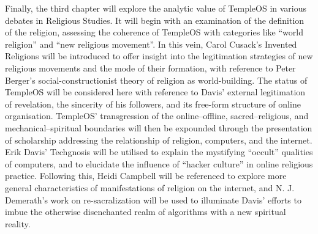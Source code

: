 \documentclass[Draft.tex]{subfiles}
\begin{document}
Finally, the third chapter will explore the analytic value of TempleOS
in various debates in Religious Studies.
It will begin with an examination of the definition of the religion,
assessing the coherence of TempleOS with categories like ``world religion''
and ``new religious movement''.
In this vein, Carol Cusack's Invented Religions will be introduced
to offer insight into the legitimation strategies of new religious movements
and the mode of their formation,
with reference to Peter Berger's social-constructionist
theory of religion as world-building.
The status of TempleOS will be considered here with reference to
Davis' external legitimation of revelation, the sincerity of his followers,
and its free-form structure of online organisation.
TempleOS' transgression of the online--offline, sacred--religious,
and mechanical--spiritual boundaries will then be expounded
through the presentation of scholarship addressing
the relationship of religion, computers, and the internet.
Erik Davis' Techgnosis will be utilised to explain
the mystifying ``occult'' qualities of computers, and to
elucidate the influence of ``hacker culture'' in online religious practice.
Following this, Heidi Campbell will be referenced to explore
more general characteristics of manifestations of religion on the internet,
and N. J. Demerath's work on re-sacralization will be used to
illuminate Davis' efforts to imbue the otherwise disenchanted
realm of algorithms with a new spiritual reality.
\end{document}
